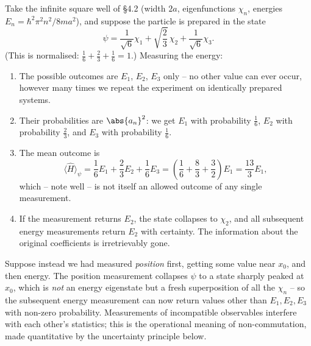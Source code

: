 \begin{example}
    Take the infinite square well of \S 4.2 (width $2a$, eigenfunctions $\chi_n$, energies $E_n = \hbar^2\pi^2 n^2/8ma^2$), and suppose the particle is prepared in the state
    $$
    \psi = \frac{1}{\sqrt{6}} \chi_1 + \sqrt{\frac{2}{3}} \, \chi_2 + \frac{1}{\sqrt{6}} \chi_3.
    $$
    (This is normalised: $\frac16 + \frac23 + \frac16 = 1$.) Measuring the energy:
    \begin{enumerate}[label=(\roman*)]
        \item The possible outcomes are $E_1$, $E_2$, $E_3$ only -- no other value can ever occur, however many times we repeat the experiment on identically prepared systems.
        \item Their probabilities are $\abs{a_n}^2$: we get $E_1$ with probability $\frac{1}{6}$, $E_2$ with probability $\frac{2}{3}$, and $E_3$ with probability $\frac{1}{6}$.
        \item The mean outcome is
        $$
        \langle \hat{H} \rangle_\psi = \frac{1}{6}E_1 + \frac{2}{3}E_2 + \frac{1}{6}E_3 = \left( \frac{1}{6} + \frac{8}{3} + \frac{3}{2} \right) E_1 = \frac{13}{3} E_1,
        $$
        which -- note well -- is not itself an allowed outcome of any single measurement.
        \item If the measurement returns $E_2$, the state collapses to $\chi_2$, and all subsequent energy measurements return $E_2$ with certainty. The information about the original coefficients is irretrievably gone.
    \end{enumerate}
    Suppose instead we had measured \emph{position} first, getting some value near $x_0$, and then energy. The position measurement collapses $\psi$ to a state sharply peaked at $x_0$, which is \emph{not} an energy eigenstate but a fresh superposition of all the $\chi_n$ -- so the subsequent energy measurement can now return values other than $E_1, E_2, E_3$ with non-zero probability. Measurements of incompatible observables interfere with each other's statistics; this is the operational meaning of non-commutation, made quantitative by the uncertainty principle below.
\end{example}

